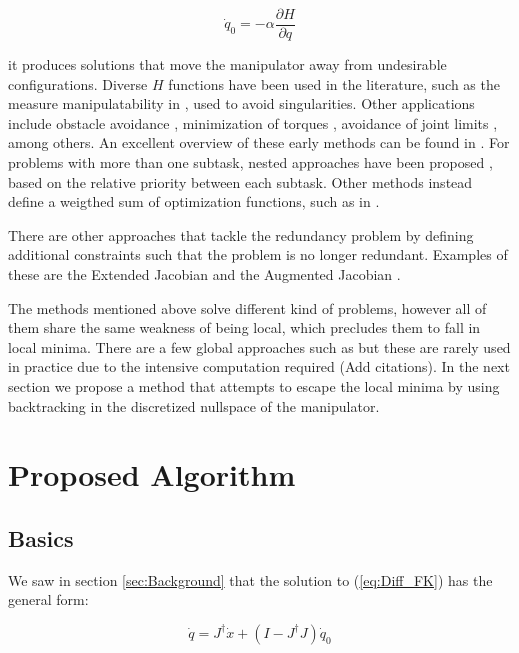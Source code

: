\documentclass[conference]{IEEEtran}
\newcommand{\J}{\ensuremath{J}}
\newcommand{\Jps}{\ensuremath{J^{\dagger}}}
\newcommand{\dx}{\ensuremath{\dot{x}}}
\newcommand{\dq}{\ensuremath{\dot{q}}}
\newcommand{\q}{\ensuremath{q}}
\begin{document}
\begin{equation}
\dq_{0} = -\alpha \dfrac{\partial H}{\partial \q}
\end{equation}

it produces solutions that move the manipulator away from undesirable configurations. 
Diverse $H$ functions have been used in the literature, such as the measure manipulatability
 in \cite{yoshikawa-ns-1985}, used to avoid singularities. Other applications include obstacle
avoidance \cite{klein-ns-1985}, minimization of torques \cite{hollerbach-ns-1985}, avoidance
of joint limits \cite{liegeois-ns-1977}, among others. An excellent overview of these early
methods can be found in \cite{siciliano-ns-1990}. For problems with more than one subtask,
nested approaches have been proposed \cite{chiaverini-ns-1997}\cite{nakamura-ns-1987}, 
based on the relative priority between each subtask. Other methods instead define a weigthed
sum of optimization functions, such as in \cite{buss-ns-2006}. 

There are other approaches that tackle the redundancy problem by defining additional constraints
 such that the problem is no longer redundant. Examples of these are the Extended Jacobian 
\cite{baillieul-ns-1985} and the Augmented Jacobian \cite{sciavicco-ns-1988}\cite{egeland-ns-1987}. 

The methods mentioned above solve different kind of problems, however all of them share the same 
weakness of being local, which precludes them to fall in local minima. There are a few global 
approaches such as  but these are rarely used in practice due to the intensive computation required
(Add citations). In the next section we propose a method that attempts to escape the local minima by 
using backtracking in the discretized nullspace of the manipulator.

\section{Proposed Algorithm}
\label{sec:ProposedAlgorithm}

\subsection{Basics}
We saw in section \ref{sec:Background} that the solution to (\ref{eq:Diff_FK}) has the general form:

\begin{equation}
\dq = \Jps \dx + (I - \Jps \J)\dq_{0}
\label{eq:IK_GeneralSol_2}
\end{equation}
\end{document}
